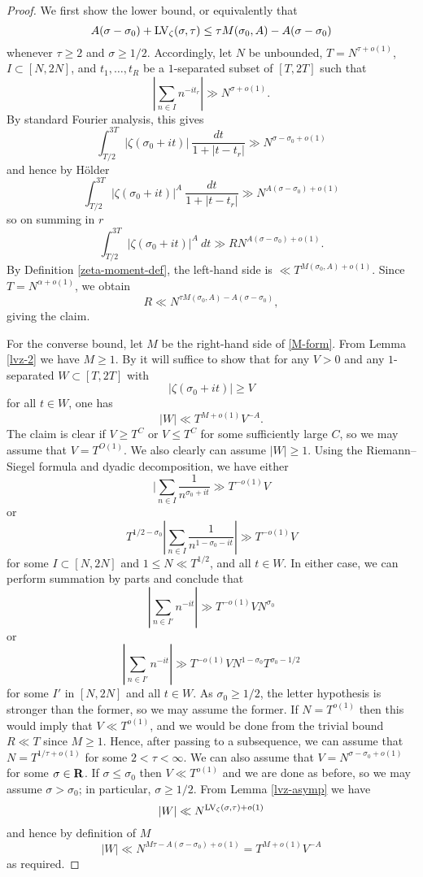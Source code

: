 \begin{proof}  We first show the lower bound, or equivalently that
$$ A(\sigma-\sigma_0) + \mathrm{LV}_\zeta(\sigma,\tau) \leq \tau M(\sigma_0,A) - A(\sigma-\sigma_0)$$
whenever $\tau \geq 2$ and $\sigma \geq 1/2$.  Accordingly, let $N$ be unbounded, $T = N^{\tau+o(1)}$, $I \subset [N,2N]$, and $t_1,\dots,t_R$ be a $1$-separated subset of $[T,2T]$ such that
$$ |\sum_{n \in I} n^{-it_r}| \gg N^{\sigma+o(1)}.$$
By standard Fourier analysis, this gives
$$ \int_{T/2}^{3T} |\zeta(\sigma_0+it)|\ \frac{dt}{1+|t-t_r|} \gg N^{\sigma - \sigma_0 + o(1)}$$
and hence by H\"older
$$ \int_{T/2}^{3T} |\zeta(\sigma_0+it)|^A\ \frac{dt}{1+|t-t_r|} \gg N^{A(\sigma - \sigma_0) + o(1)}$$
so on summing in $r$
$$ \int_{T/2}^{3T} |\zeta(\sigma_0+it)|^A\ dt \gg R N^{A(\sigma - \sigma_0) + o(1)}.$$
By Definition \ref{zeta-moment-def}, the left-hand side is $\ll T^{M(\sigma_0,A)+o(1)}$.  Since $T = N^{\alpha+o(1)}$, we obtain
$$ R \ll N^{\tau M(\sigma_0,A) - A(\sigma-\sigma_0)},$$
giving the claim.

For the converse bound, let $M$ be the right-hand side of \eqref{M-form}.  From Lemma \ref{lvz-2} we have $M \geq 1$. By \cite[\S 8.1]{ivic} it will suffice to show that for any $V>0$ and any $1$-separated $W \subset [T,2T]$ with
$$ |\zeta(\sigma_0+it)| \geq V$$
for all $t \in W$, one has
$$ |W| \ll T^{M+o(1)} V^{-A}.$$
The claim is clear if $V \geq T^C$ or $V \leq T^C$ for some sufficiently large $C$, so we may assume that $V = T^{O(1)}$.  We also clearly can assume $|W|\geq 1$.  Using the Riemann--Siegel formula \cite[Theorem 4.1]{ivic} and dyadic decomposition, we have either
$$ |\sum_{n \in I} \frac{1}{n^{\sigma_0+it}} \gg T^{-o(1)} V$$
or
$$ T^{1/2-\sigma_0} |\sum_{n \in I} \frac{1}{n^{1-\sigma_0-it}}| \gg T^{-o(1)} V$$
for some $I \subset [N,2N]$ and $1 \leq N \ll T^{1/2}$, and all $t \in W$.  In either case, we can perform summation by parts and conclude that
$$ |\sum_{n \in I'} n^{-it}|\gg T^{-o(1)} V N^{\sigma_0}$$
or
$$ |\sum_{n \in I'} n^{-it}|\gg T^{-o(1)} V N^{1-\sigma_0} T^{\sigma_0-1/2}$$
for some $I'$ in $[N,2N]$ and all $t \in W$.  As $\sigma_0 \geq 1/2$, the letter hypothesis is stronger than the former, so we may assume the former.  If $N = T^{o(1)}$ then this would imply that $V \ll T^{o(1)}$, and we would be done from the trivial bound $R \ll T$ since $M \geq 1$.
Hence, after passing to a subsequence, we can assume that $N = T^{1/\tau+o(1)}$ for some $2 < \tau < \infty$.  We can also assume that $V = N^{\sigma-\sigma_0+o(1)}$ for some $\sigma \in \mathbf{R}$. If $\sigma \leq \sigma_0$ then $V \ll T^{o(1)}$ and we are done as before, so we may assume $\sigma > \sigma_0$; in particular, $\sigma \geq 1/2$.  From Lemma \ref{lvz-asymp} we have
$$ |W| \ll N^{\mathrm{LV}_\zeta(\sigma,\tau)+o(1)}$$
and hence by definition of $M$
$$ |W| \ll N^{M \tau - A (\sigma-\sigma_0)+o(1)} = T^{M+o(1)} V^{-A}$$
as required.
\end{proof}

